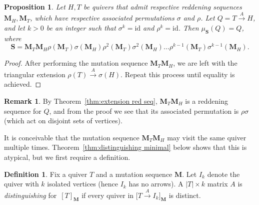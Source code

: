 \documentclass[11pt, letterpaper]{amsart}
\newtheorem{proposition}[theorem]{Proposition}
\theoremstyle{definition}
\newtheorem{remark}[theorem]{Remark}
\newtheorem{definition}[theorem]{Definition}
\numberwithin{equation}{section}
\begin{document}
\begin{proposition}
\label{prop:extensions without equality give cycles}
    Let $H,T$ be quivers that admit respective reddening sequences $\mathbf{M}_H, \mathbf{M}_T$, which have respective associated permutations $\sigma$ and $\rho$.  
    Let $Q = T \stackrel{A}{\rightarrow} H$, and let $k>0$ be an integer such that $\sigma^k = \text{id}$ and $\rho^k = \text{id}$. 
    Then $\mu_{\mathbf{S}}(Q) = Q$, where $$\mathbf{S} = \mathbf{M}_T \mathbf{M}_H \rho(\mathbf{M}_T) \sigma(\mathbf{M}_H)  \rho^2(\mathbf{M}_T) \sigma^2(\mathbf{M}_H)  \dots  \rho^{k-1}(\mathbf{M}_T) \sigma^{k-1}(\mathbf{M}_H).$$ 
\end{proposition}

\begin{proof}
    After performing the mutation sequence $\mathbf{M}_T \mathbf{M}_H$, we are left with the triangular extension $  \rho(T)  \stackrel{A}{\rightarrow} \sigma(H) $.
    Repeat this process until equality is achieved. 
\end{proof}

\begin{remark}
By Theorem~\ref{thm:extension red seq}, $\mathbf M_T \mathbf M_H$ is a reddening sequence for $Q$, and from the proof we see that its associated permutation is $\rho \sigma$ (which act on disjoint sets of vertices).
\end{remark}

It is conceivable that the mutation sequence $\mathbf{M}_T \mathbf{M}_H$ may visit the same quiver multiple times.
Theorem~\ref{thm:distinguishing minimal} below shows that this is atypical, but we first require a definition.

\begin{definition}
\label{def:distinguishing}
Fix a quiver $T$ and a mutation sequence $\mathbf{M}$.
Let $I_k$ denote the quiver with $k$ isolated vertices (hence $I_k$ has no arrows). 
A $|T| \times k$ matrix $A$ is \emph{distinguishing} for~$[T]_\mathbf{M}$ if every quiver in $\big [T \stackrel{A}{\rightarrow} I_k \big ]_\mathbf{M}$ is distinct. 
\end{definition}
\end{document}
